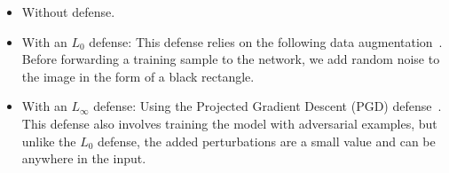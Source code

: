 \begin{itemize}[nosep,nolistsep]
    \item Without defense. %
      \item With an $L_0$ defense: This defense relies on the following data augmentation~\cite{L0}.
    Before forwarding a training sample to the network, we add random noise to the image in the form of a black rectangle.
        \item With an $L_{\infty}$ defense: Using the Projected Gradient Descent (PGD) defense~\cite{PGD}.
    This defense also involves training the model with adversarial examples, but unlike the $L_0$ defense, the added perturbations are a small value and can be anywhere in the input.
\end{itemize} 

